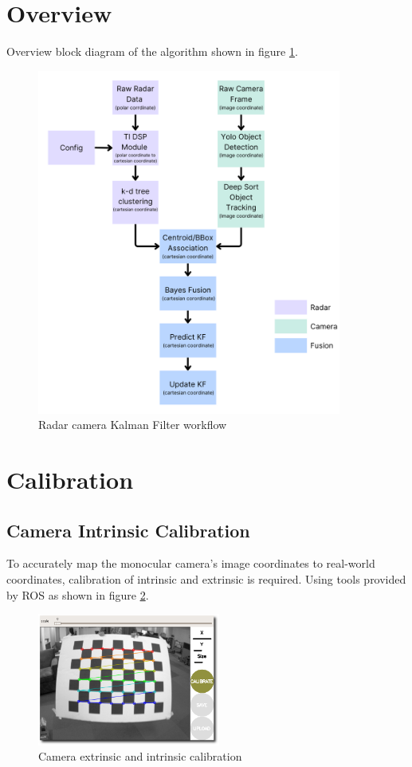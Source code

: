 \section{Overview}\label{sec:2-overview}
Overview block diagram of the algorithm shown in figure \ref*{fig:kf_update}.
\begin{figure}[hpbt]
    \centering
    \includegraphics[width=10cm]{Figures/kf_update-modified.png}%
    \caption{Radar camera Kalman Filter workflow}
    \label{fig:kf_update}
\end{figure}

\section{Calibration}\label{sec:2-calibration}
\subsection{Camera Intrinsic Calibration}
To accurately map the monocular camera's image coordinates to real-world coordinates, calibration of intrinsic and extrinsic is required.
Using tools provided by ROS \cite{cam_calib} as shown in figure \ref*{fig:camera_calibration}.

\begin{figure}[hpbt]
    \centering
    \includegraphics[width=6cm]{Figures/cam_calib.png}%
    \caption{Camera extrinsic and intrinsic calibration}
    \label{fig:camera_calibration}
\end{figure}

